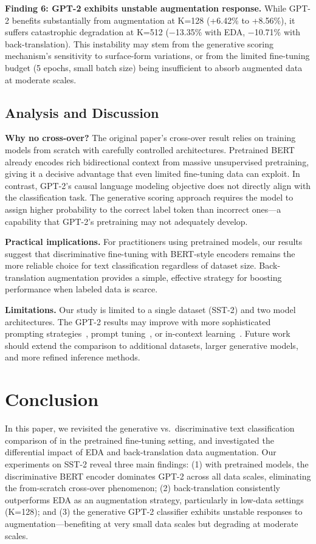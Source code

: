 \documentclass[11pt,a4paper]{article}
\begin{document}
\textbf{Finding 6: GPT-2 exhibits unstable augmentation response.} While GPT-2 benefits substantially from augmentation at K=128 (+6.42\% to +8.56\%), it suffers catastrophic degradation at K=512 ($-$13.35\% with EDA, $-$10.71\% with back-translation). This instability may stem from the generative scoring mechanism's sensitivity to surface-form variations, or from the limited fine-tuning budget (5 epochs, small batch size) being insufficient to absorb augmented data at moderate scales.

\subsection{Analysis and Discussion}

\textbf{Why no cross-over?} The original paper's cross-over result relies on training models from scratch with carefully controlled architectures. Pretrained BERT already encodes rich bidirectional context from massive unsupervised pretraining, giving it a decisive advantage that even limited fine-tuning data can exploit. In contrast, GPT-2's causal language modeling objective does not directly align with the classification task. The generative scoring approach requires the model to assign higher probability to the correct label token than incorrect ones---a capability that GPT-2's pretraining may not adequately develop.

\textbf{Practical implications.} For practitioners using pretrained models, our results suggest that discriminative fine-tuning with BERT-style encoders remains the more reliable choice for text classification regardless of dataset size. Back-translation augmentation provides a simple, effective strategy for boosting performance when labeled data is scarce.

\textbf{Limitations.} Our study is limited to a single dataset (SST-2) and two model architectures. The GPT-2 results may improve with more sophisticated prompting strategies~\cite{zhao2021calibrate}, prompt tuning~\cite{lester2021power}, or in-context learning~\cite{brown2020language}. Future work should extend the comparison to additional datasets, larger generative models, and more refined inference methods.

\section{Conclusion}

In this paper, we revisited the generative vs.\ discriminative text classification comparison of \citet{kasa2025generative} in the pretrained fine-tuning setting, and investigated the differential impact of EDA and back-translation data augmentation. Our experiments on SST-2 reveal three main findings: (1) with pretrained models, the discriminative BERT encoder dominates GPT-2 across all data scales, eliminating the from-scratch cross-over phenomenon; (2) back-translation consistently outperforms EDA as an augmentation strategy, particularly in low-data settings (K=128); and (3) the generative GPT-2 classifier exhibits unstable responses to augmentation---benefiting at very small data scales but degrading at moderate scales.
\end{document}
